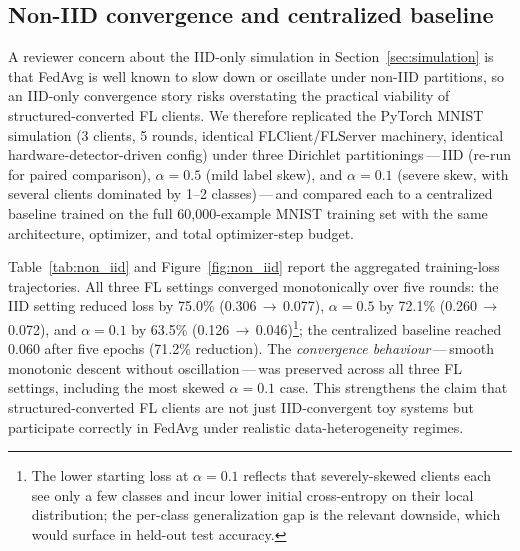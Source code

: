 
\subsection{Non-IID convergence and centralized baseline}
\label{sec:non_iid}

A reviewer concern about the IID-only simulation in
Section~\ref{sec:simulation} is that FedAvg is well known to slow down or
oscillate under non-IID partitions, so an IID-only convergence story
risks overstating the practical viability of structured-converted FL
clients. We therefore replicated the PyTorch MNIST simulation (3 clients,
5 rounds, identical FLClient/FLServer machinery, identical
hardware-detector-driven config) under three Dirichlet
partitionings\,---\,IID (re-run for paired comparison), $\alpha=0.5$ (mild
label skew), and $\alpha=0.1$ (severe skew, with several clients
dominated by 1--2 classes)\,---\,and compared each to a centralized
baseline trained on the full 60{,}000-example MNIST training set with the
same architecture, optimizer, and total optimizer-step budget.

Table~\ref{tab:non_iid} and Figure~\ref{fig:non_iid} report the
aggregated training-loss trajectories. All three FL settings converged
monotonically over five rounds: the IID setting reduced loss by 75.0\%
(0.306\,$\to$\,0.077), $\alpha=0.5$ by 72.1\% (0.260\,$\to$\,0.072), and
$\alpha=0.1$ by 63.5\% (0.126\,$\to$\,0.046)\footnote{The lower starting
loss at $\alpha=0.1$ reflects that severely-skewed clients each see only
a few classes and incur lower initial cross-entropy on their local
distribution; the per-class generalization gap is the relevant downside,
which would surface in held-out test accuracy.}; the centralized
baseline reached 0.060 after five epochs (71.2\% reduction). The
\emph{convergence behaviour}\,---\,smooth monotonic descent without
oscillation\,---\,was preserved across all three FL settings, including
the most skewed $\alpha=0.1$ case. This strengthens the claim that
structured-converted FL clients are not just IID-convergent toy systems
but participate correctly in FedAvg under realistic data-heterogeneity
regimes.

